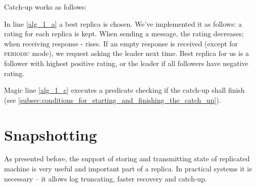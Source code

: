 Catch-up works as follows:

%  
%  
%
%  
%

\vspace{1em}

In line \ref{alg_1_a} a best replica is chosen. We've implemented it as follows: a rating for each replica is kept. When sending a message, the rating decreases; when receiving response - rises. If an empty response is received (except for \textsc{periodic} mode), we request asking the leader next time. Best replica for us is a follower with highest positive rating, or the leader if all followers have negative rating.

Magic line \ref{alg_1_c} executes a predicate checking if the catch-up shall finish (see \ref{subsec:conditions_for_starting_and_finishing_the_catch_up}).

\section{Snapshotting}
\label{sec:snapshotting}
As presented before, the support of storing and transmitting state of replicated machine is very useful and important part of a replica. In practical systems it is necessary -- it allows log truncating, faster recovery and catch-up.

